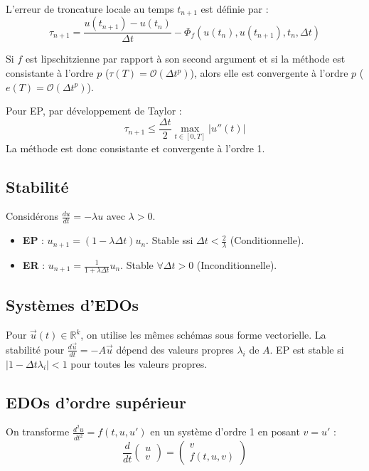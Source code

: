 \begin{definition}
L'erreur de troncature locale au temps $t_{n+1}$ est définie par :
\begin{equation}
\tau_{n+1} = \frac{u(t_{n+1}) - u(t_n)}{\Delta t} - \Phi_f(u(t_n), u(t_{n+1}), t_n, \Delta t)
\end{equation}
\end{definition}

\begin{theoreme}
Si $f$ est lipschitzienne par rapport à son second argument et si la méthode est consistante à l'ordre $p$ ($\tau(T) = \mathcal{O}(\Delta t^p)$), alors elle est convergente à l'ordre $p$ ($e(T) = \mathcal{O}(\Delta t^p)$).
\end{theoreme}

\begin{exemple}
Pour EP, par développement de Taylor :
$$ \tau_{n+1} \le \frac{\Delta t}{2} \max_{t \in [0, T]} |u''(t)| $$
La méthode est donc consistante et convergente à l'ordre 1.
\end{exemple}

\subsection{Stabilité}

\begin{explication}
Considérons $\frac{du}{dt} = -\lambda u$ avec $\lambda > 0$.
\begin{itemize}
    \item \textbf{EP} : $u_{n+1} = (1 - \lambda \Delta t)u_n$. Stable ssi $\Delta t < \frac{2}{\lambda}$ (Conditionnelle).
    \item \textbf{ER} : $u_{n+1} = \frac{1}{1 + \lambda \Delta t} u_n$. Stable $\forall \Delta t > 0$ (Inconditionnelle).
\end{itemize}
\end{explication}

\subsection{Systèmes d'EDOs}

Pour $\vec{u}(t) \in \mathbb{R}^k$, on utilise les mêmes schémas sous forme vectorielle. La stabilité pour $\frac{d\vec{u}}{dt} = -A\vec{u}$ dépend des valeurs propres $\lambda_i$ de $A$. EP est stable si $|1 - \Delta t \lambda_i| < 1$ pour toutes les valeurs propres.

\subsection{EDOs d'ordre supérieur}

\begin{algorithme}
On transforme $\frac{d^2u}{dt^2} = f(t, u, u')$ en un système d'ordre 1 en posant $v = u'$ :
$$ \frac{d}{dt} \begin{pmatrix} u \\ v \end{pmatrix} = \begin{pmatrix} v \\ f(t, u, v) \end{pmatrix} $$
\end{algorithme}
